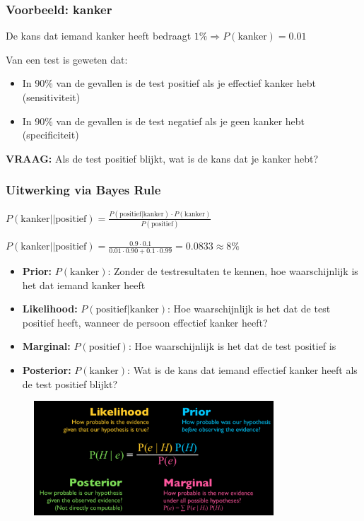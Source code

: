\documentclass{article}
\begin{document}
\subsubsection{Voorbeeld: kanker}

De kans dat iemand kanker heeft bedraagt $1\% \Rightarrow P(\text{kanker}) = 0.01$

Van een test is geweten dat:

\begin{itemize}
    \item In 90\% van de gevallen is de test positief als je effectief kanker hebt (sensitiviteit)
    \item In 90\% van de gevallen is de test negatief als je geen kanker hebt (specificiteit)
\end{itemize}

\textbf{VRAAG:} Als de test positief blijkt, wat is de kans dat je kanker hebt?


\subsubsection{Uitwerking via Bayes Rule}

\begin{center}
    $P(\text{kanker|}|\text{positief}) = \frac{P(\text{positief}|\text{kanker}) \cdot P(\text{kanker})}{P(\text{positief})}$

    $P(\text{kanker|}|\text{positief}) = \frac{0.9 \cdot 0.1}{0.01 \cdot 0.90 + 0.1 \cdot 0.99} = 0.0833 \approx 8\%$
\end{center}

\begin{itemize}
    \item \textbf{Prior:} $P(\text{kanker})$: Zonder de testresultaten te kennen, hoe waarschijnlijk is het dat iemand kanker heeft
    \item \textbf{Likelihood:} $P(\text{positief}|\text{kanker})$: Hoe waarschijnlijk is het dat de test positief heeft, wanneer de persoon effectief kanker heeft?
    \item \textbf{Marginal:} $P(\text{positief})$: Hoe waarschijnlijk is het dat de test positief is
    \item \textbf{Posterior:} $P(\text{kanker})$: Wat is de kans dat iemand effectief kanker heeft als de test positief blijkt?
\end{itemize}

\begin{figure}[H]
    \centering
    \includegraphics[width=0.8\textwidth]{bayes.png}
    \caption{}
\end{figure}
\end{document}
